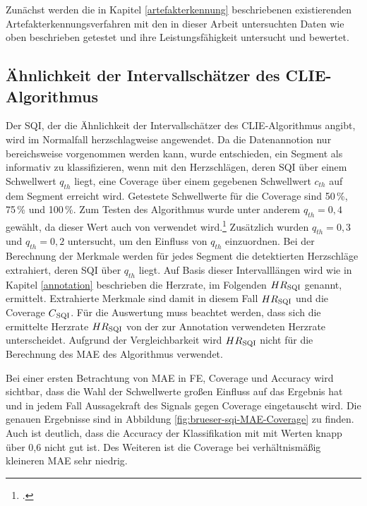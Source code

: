 Zunächst werden die in Kapitel \ref{artefakterkennung} beschriebenen existierenden Artefakterkennungsverfahren mit den in dieser Arbeit untersuchten Daten wie oben beschrieben getestet und ihre Leistungsfähigkeit untersucht und bewertet.

\subsection{Ähnlichkeit der Intervallschätzer des CLIE-Algorithmus}

Der \ac{SQI}, der die Ähnlichkeit der Intervallschätzer des \ac{CLIE}-Algorithmus angibt, wird im Normalfall herzschlagweise angewendet. Da die Datenannotion nur bereichsweise vorgenommen werden kann, wurde entschieden, ein Segment als informativ zu klassifizieren, wenn mit den Herzschlägen, deren \ac{SQI} über einem Schwellwert $q_{th}$ liegt, eine Coverage über einem gegebenen Schwellwert $c_{th}$ auf dem Segment erreicht wird. %
Getestete Schwellwerte für die Coverage sind 50\,\%, 75\,\% und 100\,\%. Zum Testen des Algorithmus wurde unter anderem $q_{th} = 0{,}4$ gewählt, da dieser Wert auch von \citeauthor{Zink2017} verwendet wird.\footcite[]{Zink2017} Zusätzlich wurden $q_{th} = 0{,}3$ und $q_{th} = 0{,}2$ untersucht, um den Einfluss von $q_{th}$ einzuordnen. Bei der Berechnung der Merkmale werden für jedes Segment die detektierten Herzschläge extrahiert, deren \ac{SQI} über $q_{th}$ liegt. Auf Basis dieser Intervalllängen wird wie in Kapitel \ref{annotation} beschrieben die Herzrate, im Folgenden $HR\textsubscript{SQI}$ genannt, ermittelt. Extrahierte Merkmale sind damit in diesem Fall $HR\textsubscript{SQI}$ und die Coverage $C\textsubscript{SQI}$. Für die Auswertung muss beachtet werden, dass sich die ermittelte Herzrate $HR\textsubscript{SQI}$ von der zur Annotation verwendeten Herzrate unterscheidet. Aufgrund der Vergleichbarkeit wird $HR\textsubscript{SQI}$ nicht für die Berechnung des \ac{MAE} des Algorithmus verwendet.

Bei einer ersten Betrachtung von \ac{MAE} in \si{FE}, Coverage und Accuracy wird sichtbar, dass die Wahl der Schwellwerte großen Einfluss auf das Ergebnis hat und in jedem Fall Aussagekraft des Signals gegen Coverage eingetauscht wird. Die genauen Ergebnisse sind in Abbildung \ref{fig:brueser-sqi-MAE-Coverage} zu finden. Auch ist deutlich, dass die Accuracy der Klassifikation mit mit Werten knapp über 0{,}6 nicht gut ist. Des Weiteren ist die Coverage bei verhältnismäßig kleineren \ac{MAE} sehr niedrig.
 

